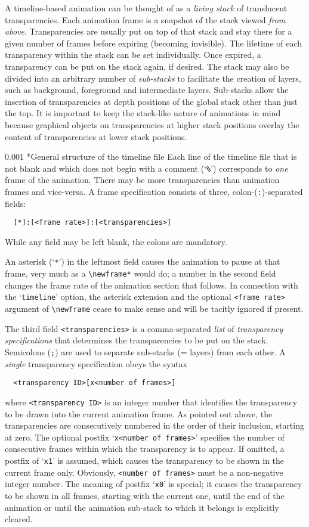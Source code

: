 \documentclass[a4paper]{article}
\makeatletter
\newcommand\myparagraph{\@startsection{paragraph}{3}{\z@}%
                                     {\parskip}%
                                     {0.001\parskip}%
                                     {\itshape\normalsize}}
\makeatother
\begin{document}
A timeline-based animation can be thought of as a \emph{living stack} of translucent transparencies. Each animation frame is a snapshot of the stack viewed \emph{from above}. Transparencies are usually put on top of that stack and stay there for a given number of frames before expiring (becoming invisible). The lifetime of each transparency within the stack can be set individually. Once expired, a transparency can be put on the stack again, if desired. The stack may also be divided into an arbitrary number of \emph{sub-stacks} to facilitate the creation of layers, such as background, foreground and intermediate layers. Sub-stacks allow the insertion of transparencies at depth positions of the global stack other than just the top. It is important to keep the stack-like nature of animations in mind because graphical objects on transparencies at higher stack positions overlay the content of transparencies at lower stack positions.

\myparagraph*{General structure of the timeline file}
Each line of the timeline file that is not blank and which does not begin with a comment (`\verb+%+') corresponds to \emph{one} frame of the animation. There may be more transparencies than animation frames and vice-versa. A frame specification consists of three, colon-(\verb+:+)-separated fields:
\begin{verbatim}
  [*]:[<frame rate>]:[<transparencies>]
\end{verbatim}
While any field may be left blank, the colons are mandatory.

An asterisk (`\verb+*+') in the leftmost field causes the animation to pause at that frame, very much as a \verb+\newframe*+ would do; a number in the second field changes the frame rate of the animation section that follows. In connection with the `\verb+timeline+' option, the asterisk extension and the optional \verb+<frame rate>+ argument of \verb+\newframe+ cease to make sense and will be tacitly ignored if present.

The third field \verb+<transparencies>+ is a comma-separated \emph{list} of \emph{transparency specifications} that determines the transparencies to be put on the stack. Semicolons (\verb+;+) are used to separate sub-stacks (= layers) from each other. A \emph{single} transparency specification obeys the syntax
\begin{verbatim}
  <transparency ID>[x<number of frames>]
\end{verbatim}
where \verb+<transparency ID>+ is an integer number that identifies the transparency to be drawn into the current animation frame. As pointed out above, the transparencies are consecutively numbered in the order of their inclusion, starting at zero. The optional postfix `\verb+x<number of frames>+' specifies the number of consecutive frames within which the transparency is to appear. If omitted, a postfix of `\verb+x1+' is assumed, which causes the transparency to be shown in the current frame only. Obviously, \verb+<number of frames>+ must be a non-negative integer number. The meaning of postfix `\verb+x0+' is special; it causes the transparency to be shown in all frames, starting with the current one, until the end of the animation or until the animation sub-stack to which it belongs is explicitly cleared.
\end{document}
